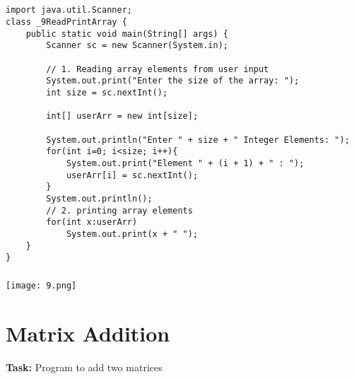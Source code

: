 \documentclass[12pt,a4paper]{article}
\begin{document}
\subsection{}
\begin{lstlisting}
import java.util.Scanner;
class _9ReadPrintArray {
    public static void main(String[] args) {
        Scanner sc = new Scanner(System.in);
    
        // 1. Reading array elements from user input
        System.out.print("Enter the size of the array: ");
        int size = sc.nextInt();
    
        int[] userArr = new int[size];
    
        System.out.println("Enter " + size + " Integer Elements: ");
        for(int i=0; i<size; i++){
            System.out.print("Element " + (i + 1) + " : ");
            userArr[i] = sc.nextInt();
        }
        System.out.println();
        // 2. printing array elements
        for(int x:userArr)
            System.out.print(x + " ");
    }
}
\end{lstlisting}

\subsubsection{}
\begin{center}
    \texttt{[image: 9.png]}
\end{center}


\section{Matrix Addition}
\textbf{Task:} Program to add two matrices
\end{document}
